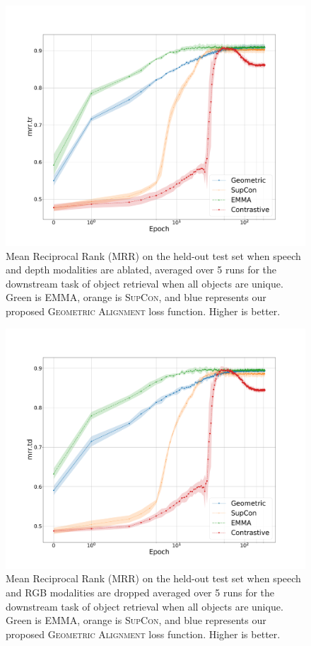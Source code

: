 \documentclass[10pt]{article} %
\newcommand{\todocmi}[1]{\todo[inline,color=green!40]{\small #1 -- Cynthia}}
\newcommand{\ours}{\textsc{EMMA}}
\newcommand{\geom}{\textsc{Geometric Alignment}}
\newcommand{\supcon}{\textsc{SupCon}}
\begin{document}
\begin{figure}[tbh]
\centering
\includegraphics[width=.99\columnwidth]{Figures/average-seeds-epochs-mrr_lr.pdf}
\caption{Mean Reciprocal Rank (MRR) on the held-out test set when speech and depth modalities are ablated, averaged over 5 runs for the downstream task of object retrieval when all objects are unique.  Green is \ours{}, orange is \supcon{}, and blue represents our proposed \geom{} loss function. Higher is better.
}
\label{fig:epochs-mrr.lr}
\end{figure}



\begin{figure}[tbh]
\centering
\includegraphics[width=.99\columnwidth]{Figures/average-seeds-epochs-mrr_ld.pdf}
\caption{Mean Reciprocal Rank (MRR) on the held-out test set when speech and RGB modalities are dropped averaged over 5 runs for the downstream task of object retrieval when all objects are unique. Green is \ours{}, orange is \supcon{}, and blue represents our proposed \geom{} loss function. Higher is better.
}
\label{fig:epochs-mrr.ld}
\end{figure}
\end{document}
